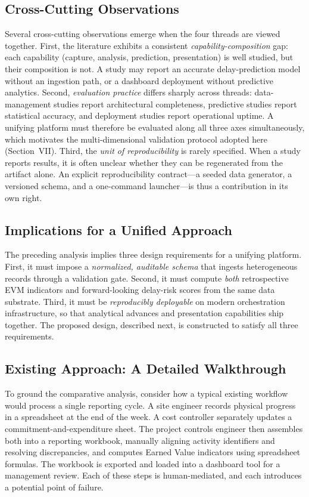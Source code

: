 \documentclass[conference]{IEEEtran}
\begin{document}
\subsection{Cross-Cutting Observations}

Several cross-cutting observations emerge when the four threads are viewed together. First, the literature exhibits a consistent \emph{capability-composition} gap: each capability (capture, analysis, prediction, presentation) is well studied, but their composition is not. A study may report an accurate delay-prediction model without an ingestion path, or a dashboard deployment without predictive analytics. Second, \emph{evaluation practice} differs sharply across threads: data-management studies report architectural completeness, predictive studies report statistical accuracy, and deployment studies report operational uptime. A unifying platform must therefore be evaluated along all three axes simultaneously, which motivates the multi-dimensional validation protocol adopted here (Section~VII). Third, the \emph{unit of reproducibility} is rarely specified. When a study reports results, it is often unclear whether they can be regenerated from the artifact alone. An explicit reproducibility contract---a seeded data generator, a versioned schema, and a one-command launcher---is thus a contribution in its own right.

\subsection{Implications for a Unified Approach}

The preceding analysis implies three design requirements for a unifying platform. First, it must impose a \emph{normalized, auditable schema} that ingests heterogeneous records through a validation gate. Second, it must compute \emph{both} retrospective EVM indicators and forward-looking delay-risk scores from the same data substrate. Third, it must be \emph{reproducibly deployable} on modern orchestration infrastructure, so that analytical advances and presentation capabilities ship together. The proposed design, described next, is constructed to satisfy all three requirements.

\subsection{Existing Approach: A Detailed Walkthrough}

To ground the comparative analysis, consider how a typical existing workflow would process a single reporting cycle. A site engineer records physical progress in a spreadsheet at the end of the week. A cost controller separately updates a commitment-and-expenditure sheet. The project controls engineer then assembles both into a reporting workbook, manually aligning activity identifiers and resolving discrepancies, and computes Earned Value indicators using spreadsheet formulas. The workbook is exported and loaded into a dashboard tool for a management review. Each of these steps is human-mediated, and each introduces a potential point of failure.
\end{document}
